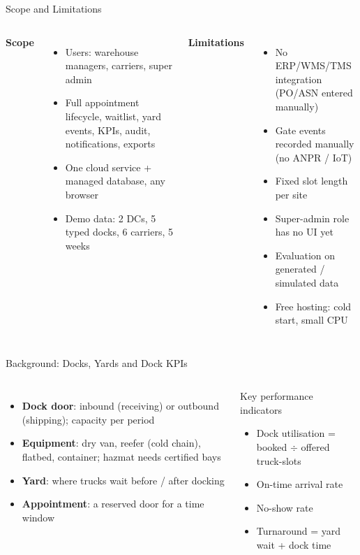 \documentclass[aspectratio=169,11pt]{beamer}
\begin{document}
\begin{frame}{Scope and Limitations}
\begin{columns}[T]
\textbf{Scope}
\begin{itemize}\small
  \item Users: warehouse managers, carriers, super admin
  \item Full appointment lifecycle, waitlist, yard events, KPIs, audit, notifications, exports
  \item One cloud service + managed database, any browser
  \item Demo data: 2 DCs, 5 typed docks, 6 carriers, 5 weeks
\end{itemize}
\textbf{Limitations}
\begin{itemize}\small
  \item No ERP/WMS/TMS integration (PO/ASN entered manually)
  \item Gate events recorded manually (no ANPR / IoT)
  \item Fixed slot length per site
  \item Super-admin role has no UI yet
  \item Evaluation on generated / simulated data
  \item Free hosting: cold start, small CPU
\end{itemize}
\end{columns}
\end{frame}

\begin{frame}{Background: Docks, Yards and Dock KPIs}
\begin{columns}[T]
\begin{itemize}\small
  \item \textbf{Dock door}: inbound (receiving) or outbound (shipping); capacity per period
  \item \textbf{Equipment}: dry van, \alert{reefer} (cold chain), flatbed, container; \alert{hazmat} needs certified bays
  \item \textbf{Yard}: where trucks wait before / after docking
  \item \textbf{Appointment}: a reserved door for a time window
\end{itemize}
\begin{block}{Key performance indicators}
\small
\begin{itemize}
  \item Dock utilisation = booked $\div$ offered truck-slots
  \item On-time arrival rate
  \item No-show rate
  \item Turnaround = yard wait + dock time
\end{itemize}
\end{block}
\end{columns}
\end{frame}
\end{document}
